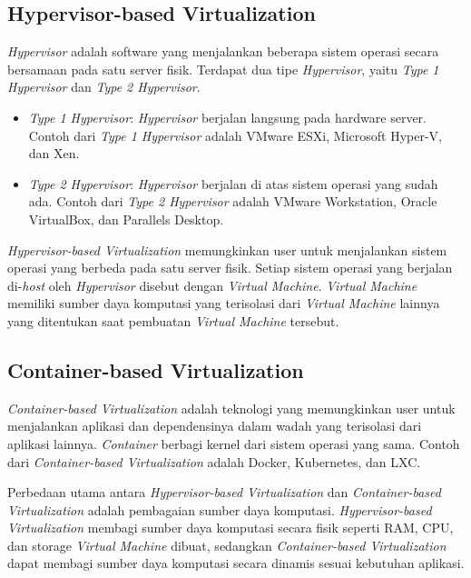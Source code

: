 \documentclass[conference]{IEEEtran}
\begin{document}
\subsection{Hypervisor-based Virtualization}

\textit{Hypervisor} adalah software yang menjalankan beberapa sistem operasi secara bersamaan pada satu server fisik. Terdapat dua tipe \textit{Hypervisor}, yaitu \textit{Type 1 Hypervisor} dan \textit{Type 2 Hypervisor}.

\begin{itemize}
    \item \textit{Type 1 Hypervisor}: \textit{Hypervisor} berjalan langsung pada hardware server. Contoh dari \textit{Type 1 Hypervisor} adalah VMware ESXi, Microsoft Hyper-V, dan Xen.
    \item \textit{Type 2 Hypervisor}: \textit{Hypervisor} berjalan di atas sistem operasi yang sudah ada. Contoh dari \textit{Type 2 Hypervisor} adalah VMware Workstation, Oracle VirtualBox, dan Parallels Desktop.
\end{itemize}

\textit{Hypervisor-based Virtualization} memungkinkan user untuk menjalankan sistem operasi yang berbeda pada satu server fisik. Setiap sistem operasi yang berjalan di-\textit{host} oleh \textit{Hypervisor} disebut dengan \textit{Virtual Machine}. \textit{Virtual Machine} memiliki sumber daya komputasi yang terisolasi dari \textit{Virtual Machine} lainnya yang ditentukan saat pembuatan \textit{Virtual Machine} tersebut.

\subsection{Container-based Virtualization}

\textit{Container-based Virtualization} adalah teknologi yang memungkinkan user untuk menjalankan aplikasi dan dependensinya dalam wadah yang terisolasi dari aplikasi lainnya. \textit{Container} berbagi kernel dari sistem operasi yang sama. Contoh dari \textit{Container-based Virtualization} adalah Docker, Kubernetes, dan LXC.

Perbedaan utama antara \textit{Hypervisor-based Virtualization} dan \textit{Container-based Virtualization} adalah pembagaian sumber daya komputasi. \textit{Hypervisor-based Virtualization} membagi sumber daya komputasi secara fisik seperti RAM, CPU, dan storage \textit{Virtual Machine} dibuat, sedangkan \textit{Container-based Virtualization} dapat membagi sumber daya komputasi secara dinamis sesuai kebutuhan aplikasi.
\end{document}
